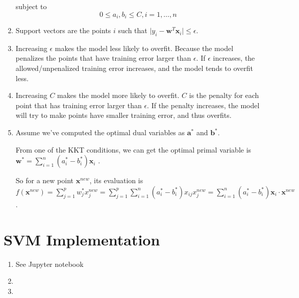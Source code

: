 \documentclass[paper=letter, fontsize=12pt]{article}
\begin{document}
\begin{enumerate}[label=(\alph*)]
	subject to 
	$$
	0 \leq a_i, b_i \leq C, i = 1, \dots, n
	$$
	
	\item
	Support vectors are the points $i$ such that $\vert y_i - \mathbf{w}^T \mathbf{x}_i \vert \leq \epsilon$.
	
	\item
	Increasing $\epsilon$ makes the model less likely to overfit. Because the model penalizes the points that have training error larger than $\epsilon$. If $\epsilon$ increases, the allowed/unpenalized training error increases, and the model tends to overfit less.
	
	\item
	Increasing $C$ makes the model more likely to overfit. $C$ is the penalty for each point that has training error larger than $\epsilon$. If the penalty increases, the model will try to make points have smaller training error, and thus overfits.
	
	\item    
	Assume we've computed the optimal dual variables as $\mathbf{a}^*$ and $\mathbf{b}^*$.
	
	From one of the KKT conditions, we can get the optimal primal variable is $\mathbf{w}^* = \sum_{i = 1}^{n} (a_i^* - b_i^*) \mathbf{x}_i$ .
	
	So for a new point $\mathbf{x}^{new}$, its evaluation is $f(\mathbf{x}^{new}) = \sum_{j = 1}^{p} w_j^* x_j^{new} = \sum_{j = 1}^{p} \sum_{i = 1}^{n} (a_i^* - b_i^*) x_{ij} x_j^{new} = \sum_{i = 1}^{n} (a_i^* - b_i^*) \mathbf{x}_i \cdot \mathbf{x}^{new }$.
\end{enumerate}

\section{SVM Implementation}
\begin{enumerate}[label=(\alph*)]
	\item See Jupyter notebook
	
	\item 
	
	\item
\end{enumerate}
\end{document}
